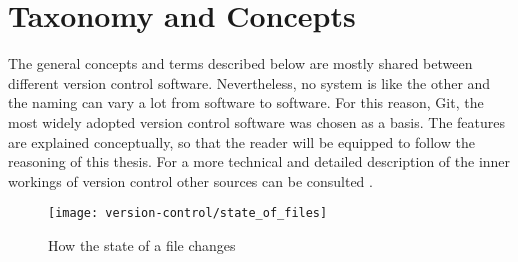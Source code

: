 \section{Taxonomy and Concepts}
The general concepts and terms described below are mostly shared between different version control software. Nevertheless, no system is like the other and the naming can vary a lot from software to software. For this reason, Git, the most widely adopted version control software \cite{_stack_2015} was chosen as a basis. The features are explained conceptually, so that the reader will be equipped to follow the reasoning of this thesis. For a more technical and detailed description of the inner workings of version control other sources can be consulted \cite{baudis_current_2009,chacon_pro_2009,pilato_version_2008}.

\begin{figure}
 \centering
 \texttt{[image: version-control/state\_of\_files]}
 \caption{How the state of a file changes}
 \label{fig:file-state}
\end{figure}


